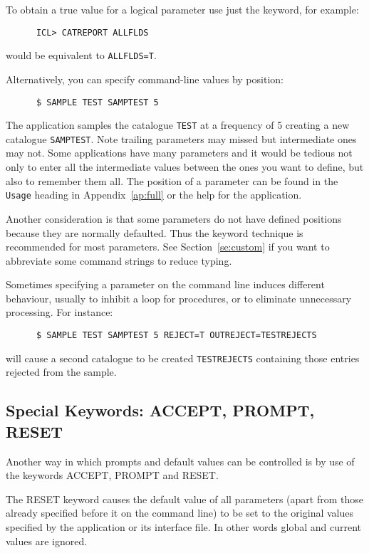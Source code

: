To obtain a true value for a logical parameter use just the keyword, 
for example:
\begin{verbatim}
      ICL> CATREPORT ALLFLDS
\end{verbatim}
would be equivalent to {\tt ALLFLDS=T}.

Alternatively, you can specify command-line values by position:
\begin{verbatim}
      $ SAMPLE TEST SAMPTEST 5
\end{verbatim}
The application samples the catalogue {\tt TEST} at a frequency of 5 creating 
a new catalogue {\tt SAMPTEST}. Note
trailing parameters may missed but
intermediate ones may not.  Some applications have many parameters and
it would be tedious not only to enter all the intermediate values
between the ones you want to define, but also to remember them all. The
position of a parameter can be found in the {\tt Usage} heading
in Appendix~\ref{ap:full} or the help for the application.

Another consideration is that some parameters do not have defined positions
because they are normally defaulted. Thus the keyword technique is
recommended for most parameters.  See Section~\ref{se:custom} if you
want to abbreviate some command strings to reduce typing.

Sometimes specifying a parameter on the command line induces different
behaviour, usually to inhibit a loop for procedures, or to eliminate
unnecessary processing.
For instance:

\begin{verbatim}
      $ SAMPLE TEST SAMPTEST 5 REJECT=T OUTREJECT=TESTREJECTS
\end{verbatim}

will cause a second catalogue to be created {\tt TESTREJECTS} containing
those entries rejected from the sample.

\subsection{Special Keywords: ACCEPT, PROMPT, RESET}
\label{se:iclkey}

Another way in which prompts and default values can be controlled is by use of
the keywords ACCEPT, PROMPT and RESET.

The RESET keyword causes the default value of all parameters (apart from those
already specified before it on the command line) to be set to the original
values specified by the application or its interface file.  In other words
global and current values are ignored.

